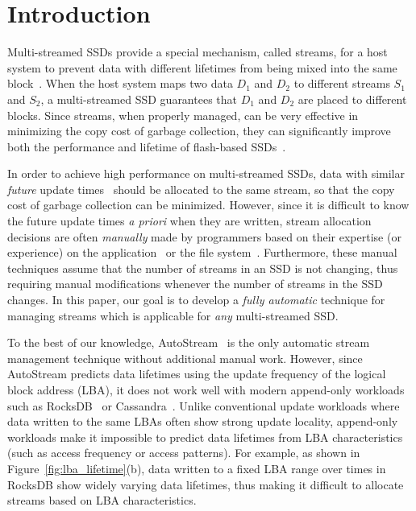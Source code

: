 \section{Introduction}
\label{sec:intro}
Multi-streamed SSDs provide a special mechanism,
called streams, for a host system to prevent data with different lifetimes 
from being mixed into the same block~\cite{T10, MultiStream}.
When the host system maps two data $D_1$ and $D_2$ to 
different streams $S_1$ and $S_2$, a multi-streamed SSD guarantees that 
$D_1$ and $D_2$ are placed to different blocks.   
Since streams, when properly managed, can be very effective in minimizing 
the copy cost of garbage collection, they
can significantly improve both the performance and lifetime of 
flash-based SSDs~\cite{MultiStream, FStream, AutoStream, Level}.

In order to achieve high performance on multi-streamed SSDs, data with similar 
{\it future} update times~\cite{PCHa}
should be allocated 
to the same stream, so that the copy cost of garbage collection can be minimized.
However, since it is difficult to know the future update times {\it a priori} when they are written,
stream allocation decisions are often {\it manually} made by programmers based on their expertise (or experience) 
on the application~\cite{MultiStream} or the file system~\cite{FStream}.  
Furthermore, these manual techniques assume 
that the number of streams in an SSD is not changing, 
thus requiring manual modifications whenever the number of streams in the SSD changes.
In this paper, our goal is to develop 
a {\it fully automatic} technique for managing streams 
which is applicable for {\it any} multi-streamed SSD.

To the best of our knowledge, AutoStream~\cite{AutoStream} is the only automatic 
stream management technique
without additional manual work.  
However, since AutoStream predicts data lifetimes using the update frequency 
of the logical block address (LBA), it does not work well with modern append-only workloads 
such as RocksDB~\cite{RocksDB} or Cassandra~\cite{Cassandra}.  
Unlike conventional update workloads where data written to the same LBAs 
often show strong update locality, 
append-only workloads make it impossible to predict data lifetimes 
from LBA characteristics (such as access frequency or access patterns).  
For example, as shown in Figure~\ref{fig:lba_lifetime}(b), 
data written to a fixed LBA range over times in RocksDB 
show widely varying data lifetimes, 
thus making it difficult to allocate streams based on LBA characteristics.

